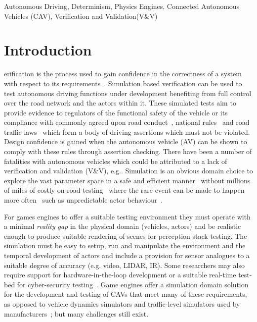 \documentclass[letterpaper, 10 pt, journal, twoside]{IEEEtran}
\begin{document}
\begin{IEEEkeywords}
Autonomous Driving, Determinism, Physics Engines, Connected Autonomous Vehicles (CAV), Verification and Validation(V\&V)
\end{IEEEkeywords}
\IEEEpeerreviewmaketitle

\section{Introduction} \label{s:introduction}
erification is the process used to gain confidence in the correctness of a system with respect to its requirements~\cite{bergeron2012writing}. Simulation based verification can be used to test autonomous driving functions under development benefiting from full control over the road network and the actors within it. These simulated tests aim to provide evidence to regulators of the functional safety of the vehicle or its compliance with commonly agreed upon road conduct~\cite{ViennaConv}, national rules~\cite{codes2015highway} and road traffic laws~\cite{RoadTraffic1988} which form a body of driving assertions which must not be violated. Design confidence is gained when the autonomous vehicle (AV) can be shown to comply with these rules through assertion checking. 
There have been a number of fatalities with autonomous vehicles which could be attributed to a lack of verification and validation (V\&V), e.g.\cite{FatalityExample}. Simulation is an obvious domain choice to explore the vast parameter space in a safe and efficient manner~\cite{korosec2019waymo} without millions of miles of costly on-road testing~\cite{kalra2016driving} where the rare event can be made to happen more often~\cite{Koopman2018} such as unpredictable actor behaviour~\cite{RobustnessAutonomy}. 

For games engines to offer a suitable testing environment they must operate with a minimal \textit{reality gap} in the physical domain (vehicles, actors) and be realistic enough \cite{Koopman2018} to produce suitable rendering of scenes for perception stack testing. The simulation must be easy to setup, run and manipulate the environment and the temporal development of actors \cite{Ulbrich2015} and include a provision for sensor analogues to a suitable degree of accuracy (e.g. video, LIDAR, IR). Some researchers may also require support for hardware-in-the-loop development or a suitable real-time test-bed for cyber-security testing~\cite{Javaid2013}. 
Game engines offer a simulation domain solution for the development and testing of CAVs that meet many of these requirements, as opposed to vehicle dynamics simulators and traffic-level simulators used by manufacturers~\cite{FrameworkAndChallenges}; but many challenges still exist.
\end{document}
